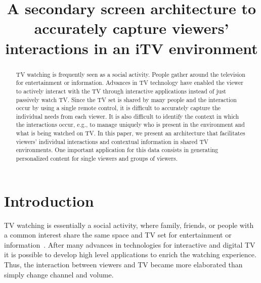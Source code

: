 \documentclass[conference,a4paper]{IEEEtran}
\begin{document}
\title{A secondary screen architecture to accurately capture viewers' interactions in an iTV environment}

\author{
\and
{}
}
\maketitle

\begin{abstract}
TV watching is frequently seen as a social activity. People gather around the television for entertainment or information. Advances in TV technology have enabled the viewer to actively interact with the TV through interactive applications instead of just passively watch TV. Since the TV set is shared by many people and the interaction occur by using a single remote control, it is difficult to accurately capture the individual needs from each viewer. It is also difficult to identify the context in which the interactions occur, e.g., to manage uniquely who is present in the environment and what is being watched on TV. In this paper, we present an architecture that facilitates viewers' individual interactions and contextual information in shared TV environments. One important application for this data consists in generating personalized content for single viewers and groups of viewers.
\end{abstract}

\IEEEpeerreviewmaketitle

\section{Introduction}

TV watching is essentially a social activity, where family, friends, or people with a common interest share the same space and TV set for entertainment or information~\cite{Masthoff2004}. After many advances in technologies for interactive and digital TV it is possible to develop high level applications to enrich the watching experience. Thus, the interaction between viewers and TV became more elaborated than simply change channel and volume.
\end{document}
